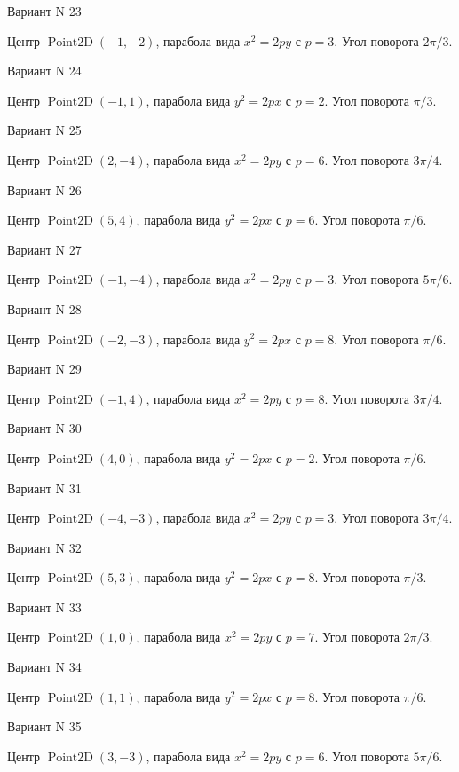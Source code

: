 \documentclass[11pt]{report}
\begin{document}
Вариант N 23

Центр $\operatorname{Point2D}\left(-1, -2\right)$, парабола вида $x^{2} = 2py$ с $p = 3$. Угол поворота $2 \pi / 3$.

Вариант N 24

Центр $\operatorname{Point2D}\left(-1, 1\right)$, парабола вида $y^{2} = 2px$ с $p = 2$. Угол поворота $\pi / 3$.

Вариант N 25

Центр $\operatorname{Point2D}\left(2, -4\right)$, парабола вида $x^{2} = 2py$ с $p = 6$. Угол поворота $3 \pi / 4$.

Вариант N 26

Центр $\operatorname{Point2D}\left(5, 4\right)$, парабола вида $y^{2} = 2px$ с $p = 6$. Угол поворота $\pi / 6$.

Вариант N 27

Центр $\operatorname{Point2D}\left(-1, -4\right)$, парабола вида $x^{2} = 2py$ с $p = 3$. Угол поворота $5 \pi / 6$.

Вариант N 28

Центр $\operatorname{Point2D}\left(-2, -3\right)$, парабола вида $y^{2} = 2px$ с $p = 8$. Угол поворота $\pi / 6$.

Вариант N 29

Центр $\operatorname{Point2D}\left(-1, 4\right)$, парабола вида $x^{2} = 2py$ с $p = 8$. Угол поворота $3 \pi / 4$.

Вариант N 30

Центр $\operatorname{Point2D}\left(4, 0\right)$, парабола вида $y^{2} = 2px$ с $p = 2$. Угол поворота $\pi / 6$.

Вариант N 31

Центр $\operatorname{Point2D}\left(-4, -3\right)$, парабола вида $x^{2} = 2py$ с $p = 3$. Угол поворота $3 \pi / 4$.

Вариант N 32

Центр $\operatorname{Point2D}\left(5, 3\right)$, парабола вида $y^{2} = 2px$ с $p = 8$. Угол поворота $\pi / 3$.

Вариант N 33

Центр $\operatorname{Point2D}\left(1, 0\right)$, парабола вида $x^{2} = 2py$ с $p = 7$. Угол поворота $2 \pi / 3$.

Вариант N 34

Центр $\operatorname{Point2D}\left(1, 1\right)$, парабола вида $y^{2} = 2px$ с $p = 8$. Угол поворота $\pi / 6$.

Вариант N 35

Центр $\operatorname{Point2D}\left(3, -3\right)$, парабола вида $x^{2} = 2py$ с $p = 6$. Угол поворота $5 \pi / 6$.
\end{document}
